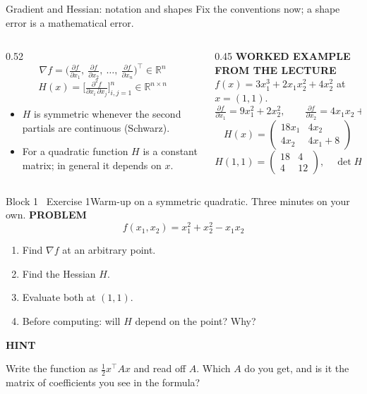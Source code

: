 \documentclass[aspectratio=169,11pt]{beamer}
\newcommand{\kicker}[1]{{\color{hseaccent}\scriptsize\bfseries\MakeUppercase{#1}}}
\newcommand{\takeaway}[2]{%
  \par\smallskip\noindent
  \colorbox{hselight}{\parbox{\dimexpr\textwidth-2\fboxsep}{%
    \kicker{#1}\par\vspace{0.12em}\footnotesize #2}}\par}
\begin{document}
\begin{frame}{Gradient and Hessian: notation and shapes}
  {Fix the conventions now; a shape error is a mathematical error.}
  \vspace{0.2em}
  \begin{columns}[T,onlytextwidth]
    \begin{column}{0.52\textwidth}
      \[ \nabla f=\Big(\tfrac{\partial f}{\partial x_1},\ \tfrac{\partial f}{\partial x_2},\ \dots,\
        \tfrac{\partial f}{\partial x_n}\Big)^{\!\top}\in\mathbb{R}^{n} \]
      \[ H(x)=\Big[\tfrac{\partial^2 f}{\partial x_i\,\partial x_j}\Big]_{i,j=1}^{n}\in\mathbb{R}^{n\times n} \]
      \vspace{-0.4em}
      \begin{itemize}\small
        \item $H$ is symmetric whenever the second partials are continuous (Schwarz).
        \item For a quadratic function $H$ is a constant matrix; in general it depends on $x$.
      \end{itemize}
    \end{column}
    \begin{column}{0.45\textwidth}
      \kicker{worked example from the lecture}\\[0.4em]
      $f(x)=3x_1^{3}+2x_1x_2^{2}+4x_2^{2}$ at $x=(1,1)$.
      \[ \tfrac{\partial f}{\partial x_1}=9x_1^{2}+2x_2^{2},\qquad
        \tfrac{\partial f}{\partial x_2}=4x_1x_2+8x_2 \]
      \[ H(x)=\begin{pmatrix} 18x_1 & 4x_2\\ 4x_2 & 4x_1+8\end{pmatrix} \]
      \[ H(1,1)=\begin{pmatrix}18&4\\4&12\end{pmatrix},\quad \det H = 200 \]
    \end{column}
  \end{columns}
\end{frame}

\begin{frame}{Block 1 \textperiodcentered\ Exercise 1}{Warm-up on a symmetric quadratic. Three minutes on your own.}
  \vspace{0.6em}
  \kicker{problem}
  \[ f(x_1,x_2)=x_1^{2}+x_2^{2}-x_1x_2 \]
  \vspace{-0.5em}
  \begin{enumerate}\small
    \item Find $\nabla f$ at an arbitrary point.
    \item Find the Hessian $H$.
    \item Evaluate both at $(1,1)$.
    \item Before computing: will $H$ depend on the point? Why?
  \end{enumerate}
  \vspace{0.5em}
  \takeaway{hint}{Write the function as $\tfrac12 x^{\top}Ax$ and read off $A$. Which $A$ do you get,
    and is it the matrix of coefficients you see in the formula?}
\end{frame}
\end{document}
